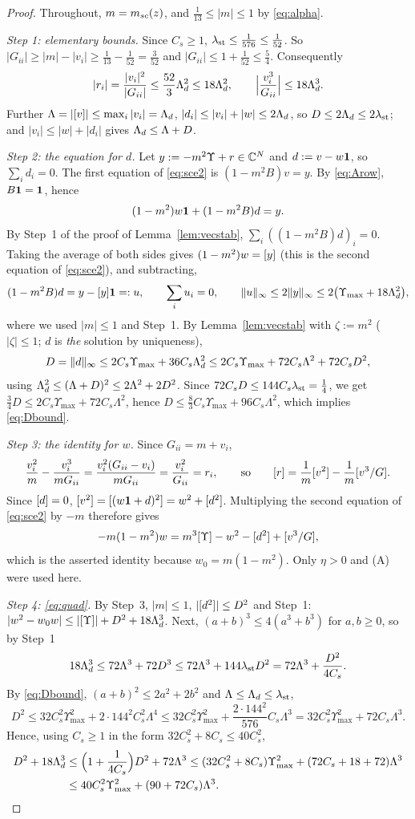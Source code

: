 \begin{proof}
Throughout, $m=m_{sc}(z)$, and $\frac1{13}\le|m|\le1$ by \eqref{eq:alpha}.

\emph{Step 1: elementary bounds.} Since $C_s\ge1$, $\lambda_{\rm st}\le\frac1{576}\le\frac1{52}$. So $|G_{ii}|\ge|m|-|v_i|\ge\frac1{13}-\frac1{52}=\frac3{52}$ and $|G_{ii}|\le1+\frac1{52}\le\frac54$. Consequently
\[
 |r_i|=\frac{|v_i|^2}{|G_{ii}|}\le\frac{52}3\Lambda_d^2\le18\Lambda_d^2,\qquad\Big|\frac{v_i^3}{G_{ii}}\Big|\le18\Lambda_d^3 .
\]
Further $\Lambda=|[v]|\le\max_i|v_i|=\Lambda_d$, $|d_i|\le|v_i|+|w|\le2\Lambda_d$, so $D\le2\Lambda_d\le2\lambda_{\rm st}$; and $|v_i|\le|w|+|d_i|$ gives $\Lambda_d\le\Lambda+D$.

\emph{Step 2: the equation for $d$.} Let $y:=-m^2\Upsilon+r\in\mathbb{C}^N$ and $d:=v-w\mathbf{1}$, so $\sum_id_i=0$. The first equation of \eqref{eq:sce2} is $(1-m^2B)v=y$. By \eqref{eq:Arow}, $B\mathbf{1}=\mathbf{1}$, hence
\[
 (1-m^2)w\mathbf{1}+(1-m^2B)d=y .
\]
By Step~1 of the proof of Lemma~\ref{lem:vecstab}, $\sum_i((1-m^2B)d)_i=0$. Taking the average of both sides gives $(1-m^2)w=[y]$ (this is the second equation of \eqref{eq:sce2}), and subtracting,
\[
 (1-m^2B)d=y-[y]\mathbf{1}=:u,\qquad\sum_iu_i=0,\qquad\|u\|_\infty\le2\|y\|_\infty\le2\big(\Upsilon_{\max}+18\Lambda_d^2\big),
\]
where we used $|m|\le1$ and Step~1. By Lemma~\ref{lem:vecstab} with $\zeta:=m^2$ ($|\zeta|\le1$; $d$ is \emph{the} solution by uniqueness),
\[
 D=\|d\|_\infty\le2C_s\Upsilon_{\max}+36C_s\Lambda_d^2\le2C_s\Upsilon_{\max}+72C_s\Lambda^2+72C_sD^2,
\]
using $\Lambda_d^2\le(\Lambda+D)^2\le2\Lambda^2+2D^2$. Since $72C_sD\le144C_s\lambda_{\rm st}=\frac14$, we get $\frac34D\le2C_s\Upsilon_{\max}+72C_s\Lambda^2$, hence $D\le\frac83C_s\Upsilon_{\max}+96C_s\Lambda^2$, which implies \eqref{eq:Dbound}.

\emph{Step 3: the identity for $w$.} Since $G_{ii}=m+v_i$,
\[
 \frac{v_i^2}{m}-\frac{v_i^3}{mG_{ii}}=\frac{v_i^2(G_{ii}-v_i)}{mG_{ii}}=\frac{v_i^2}{G_{ii}}=r_i,\qquad\text{so}\qquad[r]=\frac1m[v^2]-\frac1m[v^3/G].
\]
Since $[d]=0$, $[v^2]=[(w\mathbf{1}+d)^2]=w^2+[d^2]$. Multiplying the second equation of \eqref{eq:sce2} by $-m$ therefore gives
\[
 -m(1-m^2)w=m^3[\Upsilon]-w^2-[d^2]+[v^3/G],
\]
which is the asserted identity because $w_0=m(1-m^2)$. Only $\eta>0$ and (A) were used here.

\emph{Step 4: \eqref{eq:quad}.} By Step~3, $|m|\le1$, $|[d^2]|\le D^2$ and Step~1: $|w^2-w_0w|\le|[\Upsilon]|+D^2+18\Lambda_d^3$. Next, $(a+b)^3\le4(a^3+b^3)$ for $a,b\ge0$, so by Step~1
\[
 18\Lambda_d^3\le72\Lambda^3+72D^3\le72\Lambda^3+144\lambda_{\rm st}D^2=72\Lambda^3+\frac{D^2}{4C_s} .
\]
By \eqref{eq:Dbound}, $(a+b)^2\le2a^2+2b^2$ and $\Lambda\le\Lambda_d\le\lambda_{\rm st}$,
\[
 D^2\le32C_s^2\Upsilon_{\max}^2+2\cdot144^2C_s^2\Lambda^4\le32C_s^2\Upsilon_{\max}^2+\frac{2\cdot144^2}{576}C_s\Lambda^3=32C_s^2\Upsilon_{\max}^2+72C_s\Lambda^3 .
\]
Hence, using $C_s\ge1$ in the form $32C_s^2+8C_s\le40C_s^2$,
\[
\begin{aligned}
 D^2+18\Lambda_d^3&\le\Big(1+\frac1{4C_s}\Big)D^2+72\Lambda^3\le(32C_s^2+8C_s)\Upsilon_{\max}^2+(72C_s+18+72)\Lambda^3\\
 &\le40C_s^2\Upsilon_{\max}^2+(90+72C_s)\Lambda^3 .
\end{aligned}
\]


\end{proof}
